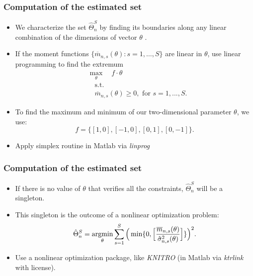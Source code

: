 \documentclass[10pt,letterpaper]{beamer}
\begin{document}
\begin{frame}
\frametitle{Computation of the estimated set}

\begin{itemize}
\item We characterize the set $\hat{\Theta}^{S}_{n}$ by finding its
boundaries along any linear combination of the dimensions of vector $\theta$%
. 

\item If the moment functions $\{\overline{m}_{n,s}(\theta ): s=1,\dots,S\}$
are linear in $\theta$, use linear programming to find the extremum  
\begin{equation}
\begin{split}
& \max_{\theta}\quad f\cdot \theta \\
& \quad \text{s.t.} \\
& \quad \overline{m}_{n,s}(\theta )\geq 0,\text{ for }s=1,...,S.
\label{eq: optvert}
\end{split}%
\end{equation}

\item To find the maximum and minimum of our two-dimensional parameter $%
\theta$, we use:  
\begin{equation*}
f=\{[1,0],[-1,0],[0,1],[0,-1]\}.
\end{equation*}

\item Apply simplex routine in Matlab via \textit{linprog}
\end{itemize}
\end{frame}


\begin{frame}
\frametitle{Computation of the estimated set}

\begin{itemize}
\item If there is no value of $\theta$ that verifies all the constraints, $%
\hat{\Theta}^{S}_{n}$ will be a singleton. 

\item This singleton is the outcome of a nonlinear optimization problem:  
\begin{equation*}
\hat{\Theta}^{S}_{n} = \operatornamewithlimits{argmin}_{\theta}\sum_{s=1}^{S}%
\Big(\min\{0,\Big[\frac{\overline{m}_{n,s}(\theta)}{\hat{\sigma}%
^{2}_{n,s}(\theta)}\Big]\}\Big)^{2}.
\end{equation*}

\item Use a nonlinear optimization package, like \textit{KNITRO} (in Matlab
via \textit{ktrlink} with license).
\end{itemize}
\end{frame}
\end{document}
